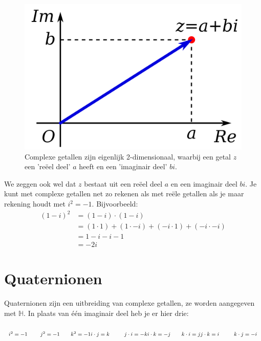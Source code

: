 \begin{figure}[h!]
    \centering
    \includegraphics[scale=0.15]{pictures/figuren/complex.png}
    \caption{Complexe getallen zijn eigenlijk 2-dimensionaal, waarbij een getal $z$ een 'reëel deel' $a$ heeft en een 'imaginair deel' $bi$.}
    \label{fig:lijnreeel}
\end{figure}

\newpage
We zeggen ook wel dat $z$ bestaat uit een reëel deel $a$ en een imaginair deel $bi$.  Je kunt met complexe getallen net zo rekenen als met reële getallen als je maar rekening houdt met $  i^2 = -1$. Bijvoorbeeld: 
\begin{align*}
    (1-i)^2 &= (1-i)\cdot (1-i) \\
            &= (1\cdot 1) + (1\cdot -i) + (-i \cdot 1) + (-i\cdot -i) \\
            &= 1 - i - i -1 \\
            &= -2i 
\end{align*}

\section{Quaternionen}
Quaternionen zijn een uitbreiding van complexe getallen, ze worden aangegeven met $\mathbb{H}$. In plaats van één imaginair deel heb je er hier drie:\\ \\
$ i^2 = -1 \qquad  \ j^2 = -1 \qquad k^2 = -1   \\
i\cdot j = k \qquad \ \ j\cdot i = -k \\
i\cdot k = -j \qquad k\cdot i = j \\
j\cdot k = i \qquad \ \ k\cdot j = -i \\ $ \\

